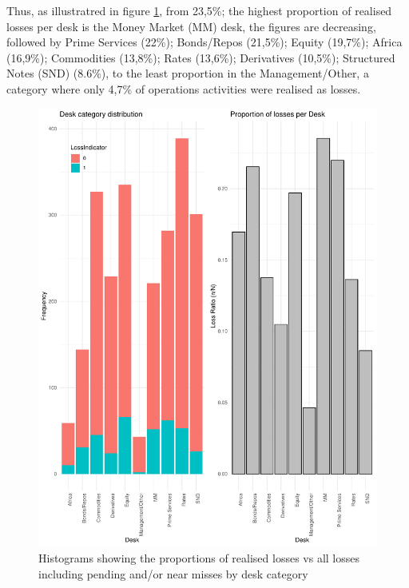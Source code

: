 \documentclass{DissertateUSU}
\begin{document}
Thus, as illustratred in figure \ref{Desk_Proportions}, from 23,5\%; the
highest proportion of realised losses per desk is the Money Market (MM)
desk, the figures are decreasing, followed by Prime Services (22\%);
Bonds/Repos (21,5\%); Equity (19,7\%); Africa (16,9\%); Commodities
(13,8\%); Rates (13,6\%); Derivatives (10,5\%); Structured Notes (SND)
(8.6\%), to the least proportion in the Management/Other, a category
where only 4,7\% of operations activities were realised as losses.

\singlespacing

\doublespacing

\begin{figure}
\centering
\includegraphics[scale=0.5]{Exploratory_Desk_Proportions.pdf}
\caption[Desk category by realised losses]{Histograms showing the proportions of realised losses vs all losses including pending and/or near misses by desk category}
\label{Desk_Proportions}
\end{figure}
\end{document}
